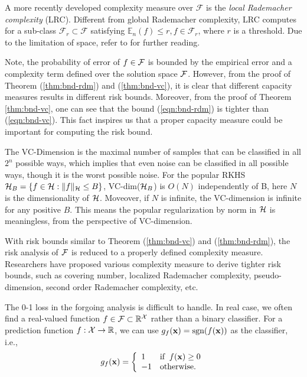 A more recently developed complexity measure over $\mathcal F$ is the {\em local Rademacher complexity} (LRC)\cite{colt/BartlettBM02}. Different from global Rademacher complexity, LRC computes for a sub-class $\mathcal F_r \subset\mathcal F$ satisfying $\mathbb E_n(f)\leq r, f\in\mathcal F_r$, where $r$ is a threshold. Due to the limitation of space, refer to \cite{colt/BartlettBM02} for further reading.

Note, the probability of error of $f \in {\cal F}$ is bounded by the empirical error and a complexity term defined over the solution space ${\cal F}$. However, from the proof of Theorem (\ref{thm:bnd-rdm}) and (\ref{thm:bnd-vc}), it is clear that different capacity measures results in different risk bounds. Moreover, from the proof of Theorem \ref{thm:bnd-vc}, one can see that the bound (\ref{eqn:bnd-rdm}) is tighter than (\ref{eqn:bnd-vc}). This fact inspires us that a proper capacity measure could be important for computing the risk bound.

The VC-Dimension is the maximal number of samples that can be
classified in all $2^n$ possible ways, which implies that even noise can be
classified in all possible ways, though it is the worst possible noise. For the
popular RKHS ${\cal H}_B = \{f \in {\cal H}: \|f\|_{{\cal H}} \leq B\}$, VC-dim(${\cal H}_B$) is
$O(N)$ independently of B, here $N$ is the dimensionality of ${\cal H}$.
Moveover, if $N$ is infinite, the VC-dimension is infinite for any positive
$B$. This means the popular regularization by norm in ${\cal H}$ is
meaningless, from the perspective of VC-dimension.

With risk bounds similar to Theorem (\ref{thm:bnd-vc}) and
(\ref{thm:bnd-rdm}), the risk analysis of ${\cal F}$ is reduced to a properly
defined complexity measure. Researchers have proposed various
complexity measure to derive tighter risk bounds, such as covering
number, localized Rademacher complexity, pseudo-dimension, second
order Rademacher complexity, etc.


The 0-1 loss in the forgoing analysis is difficult to handle. In real case, we often find a
real-valued function $f\in{\cal F}\subset{\mathbb R}^{\cal X}$ rather than a binary classifier. For a
prediction function $f:{\cal X}\rightarrow {\mathbb R}$, we can use $g_f(\mathbf{x}) = {\mbox{sgn}}(f(\mathbf{x}))$ as the
classifier, i.e.,
\begin{eqnarray}
g_f(\mathbf{x}) = \left\{
\begin{array}{ll}
1 &\mbox{if}\;\;f(\mathbf{x}) \geq 0\\
-1 &\mbox{otherwise.}
\end{array}
\right.
\end{eqnarray}

